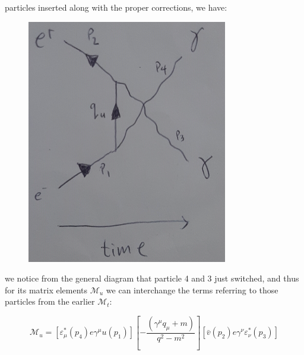 \documentclass[11pt]{article}
\theoremstyle{definition}
\begin{document}
particles inserted along with the proper corrections, we have:

\begin{figure}[H]
    \centering
    \includegraphics[scale = 0.4]{final u-channel.png}
\end{figure}

we notice from the general diagram that particle 4 and 3 just switched, and thus for its matrix elements $\mathcal{M}_u$ we can interchange the terms referring to those particles from the earlier $\mathcal{M}_t$:

\begin{equation}
    \boxed{
        \mathcal{M}_u = 
        \left[
            \varepsilon^{*}_{\mu}(p_4)e\gamma^{\mu}u(p_1)
        \right]
        \left[
            -\frac{(\gamma^{\mu} q_{\mu} + m)}{q^2-m^2}
        \right]
        \left[
            \bar{v}(p_2)e\gamma^{\nu}\varepsilon^{*}_{\nu}(p_3)
        \right]
    }
    \end{equation}



\end{document}
